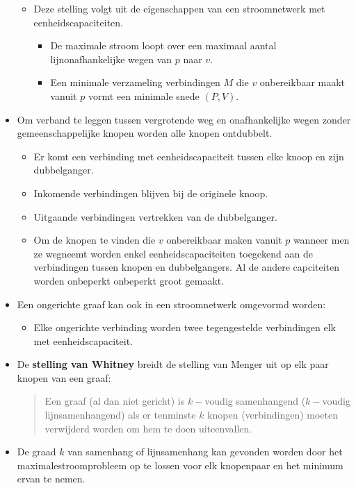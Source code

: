 \begin{itemize}
\begin{itemize}
        \item Deze stelling volgt uit de eigenschappen van een stroomnetwerk met eenheidscapaciteiten.
        \begin{itemize}
            \item De maximale stroom loopt over een maximaal aantal lijnonafhankelijke wegen van $p$ naar $v$.
            \item Een minimale verzameling verbindingen $M$ die $v$ onbereikbaar maakt vanuit $p$ vormt een minimale snede $(P ,V)$. 
        \end{itemize}
    \end{itemize}
    \item Om verband te leggen tussen vergrotende weg en onafhankelijke wegen zonder gemeenschappelijke knopen worden alle knopen ontdubbelt.
    \begin{itemize}
        \item Er komt een verbinding met eenheidscapaciteit tussen elke knoop en zijn dubbelganger.
        \item Inkomende verbindingen blijven bij de originele knoop.
        \item Uitgaande verbindingen vertrekken van de dubbelganger.
        \item Om de knopen te vinden die $v$ onbereikbaar maken vanuit $p$ wanneer men ze wegneemt worden enkel eenheidscapaciteiten toegekend aan de verbindingen tussen knopen en dubbelgangers. Al de andere capciteiten worden onbeperkt onbeperkt groot gemaakt.
    \end{itemize}
    \item Een ongerichte graaf kan ook in een stroomnetwerk omgevormd worden:
    \begin{itemize}
        \item Elke ongerichte verbinding worden twee tegengestelde verbindingen elk met eenheidscapaciteit. 
    \end{itemize}
    \item De \textbf{stelling van Whitney} breidt de stelling van Menger uit op elk paar knopen van een graaf:
    \begin{quote}
        Een graaf (al dan niet gericht) is $k-$voudig samenhangend ($k-$voudig lijnsamenhangend) als er tenminste $k$ knopen (verbindingen) moeten verwijderd worden om hem te doen uiteenvallen.
    \end{quote}
    \item De graad $k$ van samenhang of lijnsamenhang kan gevonden worden door het maximalestroomprobleem op te lossen voor elk knopenpaar en het minimum ervan te nemen.

\end{itemize}
